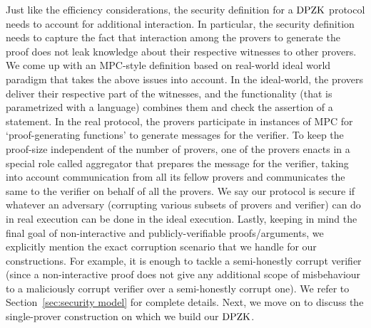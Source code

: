 
Just like the efficiency considerations, the security definition for a $\text{DPZK}$ protocol needs to account for additional interaction. In particular, the security definition needs to capture the fact that interaction among the provers to generate the proof does not leak knowledge about their respective witnesses to other provers. 
We come up with an MPC-style definition based on real-world ideal world paradigm \cite{Canetti00,Goldreich2001,Lindell17,CohenL14}  that takes the above issues into account. In the ideal-world, the provers deliver their respective part of the witnesses, and the functionality (that is parametrized with a language) combines them and check the assertion of a statement. In the real protocol, the provers participate in instances of MPC for `proof-generating functions' to generate messages for the verifier. To keep the proof-size independent of the number of provers, one of the provers enacts in a special role called aggregator that prepares the message for the verifier, taking into account communication from all its fellow provers and communicates the same to the verifier on behalf of all the provers. We say our protocol is secure if whatever an adversary (corrupting various subsets of provers and verifier) can do in real execution can be done in the ideal execution. Lastly, keeping in mind the final goal of non-interactive and publicly-verifiable proofs/arguments, we explicitly mention the exact corruption scenario that we handle for our constructions.  For example, it is enough to tackle a semi-honestly corrupt verifier (since a non-interactive proof does not give any additional scope of misbehaviour to a maliciously corrupt verifier over a semi-honestly corrupt one).  We refer to Section~\ref{sec:security model} for complete details. Next, we move on to discuss the single-prover construction on which we build our $\text{DPZK}$. 

